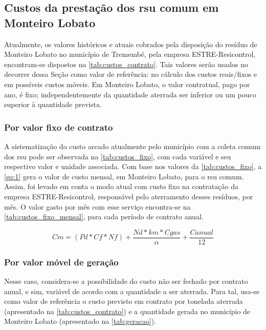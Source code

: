 \newpage
\subsection{Custos da prestação dos \gls{rsu} comum em Monteiro Lobato}

Atualmente, os valores históricos e atuais cobrados pela disposição do resíduo de Monteiro Lobato no município de Tremembé, pela empresa ESTRE-Resicontrol, encontram-se dispostos na \autoref{tab:custos_contrato}. Tais valores serão usados no decorrer dessa Seção como valor de referência: no cálculo dos custos reais/fixos e em possíveis custos móveis. Em Monteiro Lobato, o valor contratual, pago por ano, é fixo; independentemente da quantidade aterrada ser inferior ou um pouco superior à quantidade prevista.



\subsubsection{Por valor fixo de contrato}
	
A sistematização do custo arcado atualmente pelo município com a coleta comum dos \gls{rsu} pode ser observada na \autoref{tab:custos_fixo}, com cada variável e seu respectivo valor e unidade associada. Com base nos valores da \autoref{tab:custos_fixo}, a \autoref{eq:1} gera o valor de custo mensal, em Monteiro Lobato, para o \gls{rsu} comum. Assim, foi levado em conta o modo atual com custo fixo na contratação da empresa ESTRE-Resicontrol, responsável pelo aterramento desses resíduos, por mês. O valor gasto por mês com esse serviço encontra-se na \autoref{tab:custos_fixo_mensal}, para cada período de contrato anual.

	
	\FloatBarrier
	
\begin{equation}
\label{eq:1}
Cm = (Pd*Cf*Nf)+\frac{Nd*km*Cgas}{\alpha}+\frac{Canual}{12}
\end{equation}
	
	
	\FloatBarrier
	
\newpage	
\subsubsection{Por valor móvel de geração}	

Nesse caso, considera-se a possibilidade do custo não ser fechado por contrato anual, e sim, variável de acordo com a quantidade a ser aterrada. Para tal, usa-se como valor de referência o custo previsto em contrato por tonelada aterrada (apresentado na \autoref{tab:custos_contrato}) e a quantidade gerada no município de Monteiro Lobato (apresentado na \autoref{tab:geracao}).
 
